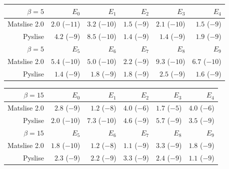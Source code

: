 \begin{table}

    \begin{center}
        \begin{tabular}{rrrrrr}
            \toprule
            $\beta=5$    & $E_{0}$       & $E_{1}$       & $E_{2}$      & $E_{3}$       & $E_{4}$       \\
            \midrule
            Matslise 2.0 & $2.0$ ($-11$) & $3.2$ ($-10$) & $1.5$ ($-9$) & $2.1$ ($-10$) & $1.5$ ($-9$)  \\
            Pyslise      & $4.2$ ($-9$)  & $8.5$ ($-10$) & $1.4$ ($-9$) & $1.4$ ($-9$)  & $1.9$ ($-9$)  \\
            \midrule
            \midrule
            $\beta=5$    & $E_{5}$       & $E_{6}$       & $E_{7}$      & $E_{8}$       & $E_{9}$       \\
            \midrule
            Matslise 2.0 & $5.4$ ($-10$) & $5.0$ ($-10$) & $2.2$ ($-9$) & $9.3$ ($-10$) & $6.7$ ($-10$) \\
            Pyslise      & $1.4$ ($-9$)  & $1.8$ ($-9$)  & $1.8$ ($-9$) & $2.5$ ($-9$)  & $1.6$ ($-9$)  \\
            \bottomrule
        \end{tabular}
    \end{center}

    \begin{center}
        \begin{tabular}{rrrrrr}
            \toprule
            $\beta=15$   & $E_{0}$       & $E_{1}$       & $E_{2}$      & $E_{3}$      & $E_{4}$      \\
            \midrule
            Matslise 2.0 & $2.8$ ($-9$)  & $1.2$ ($-8$)  & $4.0$ ($-6$) & $1.7$ ($-5$) & $4.0$ ($-6$) \\
            Pyslise      & $2.0$ ($-10$) & $7.3$ ($-10$) & $4.6$ ($-9$) & $5.7$ ($-9$) & $3.5$ ($-9$) \\
            \midrule
            \midrule
            $\beta=15$   & $E_{5}$       & $E_{6}$       & $E_{7}$      & $E_{8}$      & $E_{9}$      \\
            \midrule
            Matslise 2.0 & $1.8$ ($-10$) & $1.2$ ($-8$)  & $1.1$ ($-9$) & $3.3$ ($-9$) & $1.8$ ($-9$) \\
            Pyslise      & $2.3$ ($-9$)  & $2.2$ ($-9$)  & $3.3$ ($-9$) & $2.4$ ($-9$) & $1.1$ ($-9$) \\
            \bottomrule
        \end{tabular}
    \end{center}


\end{table}
